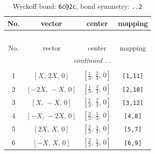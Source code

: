 \documentclass[fleqn,8pt]{jsarticle}
\begin{document}
\renewcommand{\arraystretch}{1.2}
\begin{longtable}{cccc}
\caption{Wyckoff bond: {\tt 6c@2c}, bond symmetry: {\tt ..2}}
 \\
 \hline \hline
No. & vector & center & mapping \\ \hline \endfirsthead

\multicolumn{3}{l}{\tablename\ \thetable{}} \\
 \hline \hline
No. & vector & center & mapping \\ \hline \endhead

 \hline \hline
\multicolumn{3}{r}{\footnotesize\it continued ...} \\ \endfoot

 \hline \hline
\multicolumn{3}{r}{} \\ \endlastfoot

1 & $\left[ X,\, 2 X,\, 0 \right]$ & $\left[ \frac{1}{3},\, \frac{2}{3},\, 0 \right]$ & {\tt [1,11]} \\ \hline
2 & $\left[ - 2 X,\, - X,\, 0 \right]$ & $\left[ \frac{1}{3},\, \frac{2}{3},\, 0 \right]$ & {\tt [2,10]} \\ \hline
3 & $\left[ X,\, - X,\, 0 \right]$ & $\left[ \frac{1}{3},\, \frac{2}{3},\, 0 \right]$ & {\tt [3,12]} \\ \hline
4 & $\left[ - X,\, - 2 X,\, 0 \right]$ & $\left[ \frac{2}{3},\, \frac{1}{3},\, 0 \right]$ & {\tt [4,8]} \\ \hline
5 & $\left[ 2 X,\, X,\, 0 \right]$ & $\left[ \frac{2}{3},\, \frac{1}{3},\, 0 \right]$ & {\tt [5,7]} \\ \hline
6 & $\left[ - X,\, X,\, 0 \right]$ & $\left[ \frac{2}{3},\, \frac{1}{3},\, 0 \right]$ & {\tt [6,9]} \\
\end{longtable}
\renewcommand{\arraystretch}{1.2}
\end{document}
